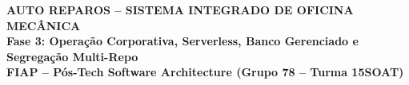 \documentclass[9pt,a4paper]{article}
\begin{document}
\pagestyle{empty}


\begin{center}
    {\Large \textbf{\color{primary} AUTO REPAROS -- SISTEMA INTEGRADO DE OFICINA MECÂNICA}} \\
    \vspace{0.08cm}
    {\small \textbf{\color{accentblue}Fase 3: Operação Corporativa, Serverless, Banco Gerenciado e Segregação Multi-Repo}} \\
    \vspace{0.04cm}
    {\footnotesize \textbf{FIAP -- Pós-Tech Software Architecture (Grupo 78 -- Turma 15SOAT)}}
\end{center}

\vspace{0.1cm}
\end{document}

